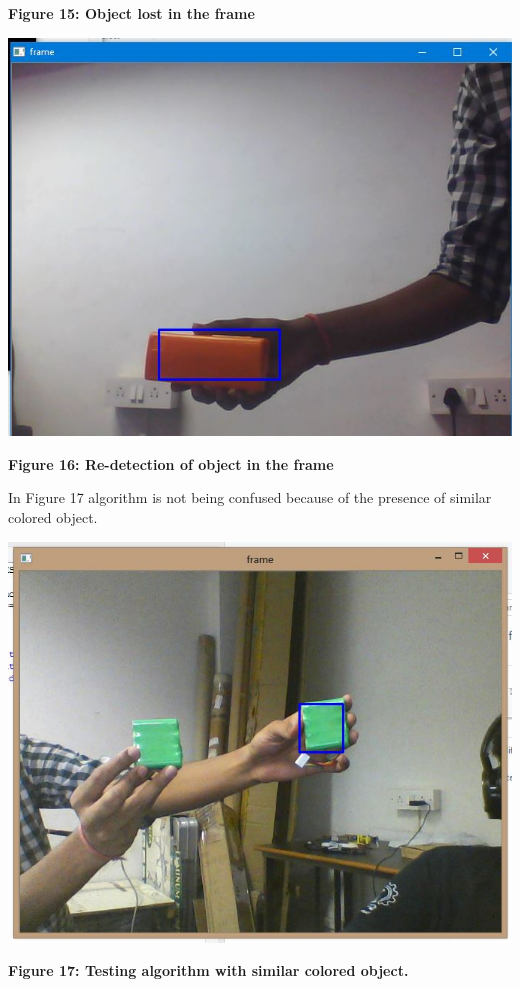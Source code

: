 \documentclass[11pt,a4paper]{article}
\begin{document}
	\begin{center}
		\textbf{Figure 15: Object lost in the frame}
	\end{center}
	\begin{center}
		\includegraphics[scale=0.8]{Image3.JPG}
	\end{center}
	\begin{center}
		\textbf{Figure 16: Re-detection of object in the frame}
	\end{center}
	 In Figure 17 algorithm is not being confused because of the presence of similar colored object.
	 \begin{center}
	 	\includegraphics[scale=0.8]{test.JPG}
	 \end{center}
	 \begin{center}
	 	\textbf{Figure 17: Testing algorithm with similar colored object.}
	 \end{center}
\end{document}
